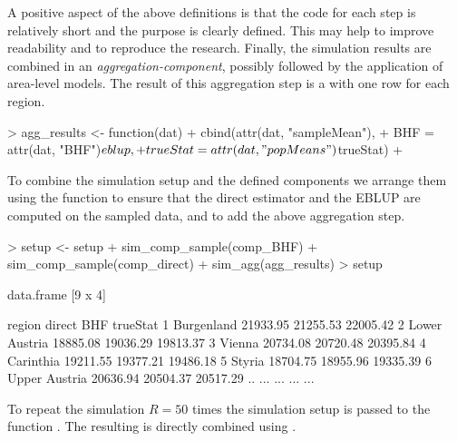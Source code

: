 \documentclass[article]{ajs}
\begin{document}
A positive aspect of the above definitions is that the code for each step is relatively short and the purpose is clearly defined. This may help to improve readability and to reproduce the research. Finally, the simulation results are combined in an \textit{aggregation-component}, possibly followed by the application of area-level models. The result of this aggregation step is a  with one row for each region.

\begin{Schunk}
\begin{Sinput}
> agg_results <- function(dat) {
+   cbind(attr(dat, "sampleMean"),
+         BHF = attr(dat, "BHF")$eblup,
+         trueStat = attr(dat, "popMeans")$trueStat)
+ }
\end{Sinput}
\end{Schunk}

To combine the simulation setup and the defined components we arrange them using the function  to ensure that the direct estimator and the EBLUP are computed on the sampled data, and  to add the above aggregation step.

\begin{Schunk}
\begin{Sinput}
> setup <- setup %
+   sim_comp_sample(comp_BHF) %
+   sim_comp_sample(comp_direct) %
+   sim_agg(agg_results)
> setup
\end{Sinput}
\begin{Soutput}
data.frame [9 x 4]

          region   direct      BHF trueStat
1     Burgenland 21933.95 21255.53 22005.42
2  Lower Austria 18885.08 19036.29 19813.37
3         Vienna 20734.08 20720.48 20395.84
4      Carinthia 19211.55 19377.21 19486.18
5         Styria 18704.75 18955.96 19335.39
6  Upper Austria 20636.94 20504.37 20517.29
..           ...      ...      ...      ...
\end{Soutput}
\end{Schunk}

To repeat the simulation $R = 50$ times the simulation setup is passed to the function . The resulting  is directly combined using .
\end{document}
